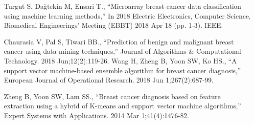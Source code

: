 \documentclass[conference]{IEEEtran}
\begin{document}
\begin{thebibliography}{00}
 Turgut S, Dağtekin M, Ensari T., ``Microarray breast cancer data classification using machine learning methods,'' In 2018 Electric Electronics, Computer Science, Biomedical Engineerings' Meeting (EBBT) 2018 Apr 18 (pp. 1-3). IEEE.

 Chaurasia V, Pal S, Tiwari BB., ``Prediction of benign and malignant breast cancer using data mining techniques,'' Journal of Algorithms \& Computational Technology. 2018 Jun;12(2):119-26.
 Wang H, Zheng B, Yoon SW, Ko HS., ``A support vector machine-based ensemble algorithm for breast cancer diagnosis,'' European Journal of Operational Research. 2018 Jun 1;267(2):687-99.
 
 Zheng B, Yoon SW, Lam SS., ``Breast cancer diagnosis based on feature extraction using a hybrid of K-means and support vector machine algorithms,'' Expert Systems with Applications. 2014 Mar 1;41(4):1476-82.


\end{thebibliography}
\end{document}
